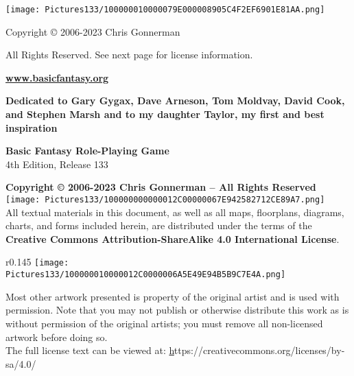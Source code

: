 \documentclass[a4paper,twoside,openany,10pt]{book}
\begin{document}
	
\justifying
\thispagestyle{empty}

\begin{center}
\texttt{[image: Pictures133/100000010000079E000008905C4F2EF6901E81AA.png]}
\end{center}

\begin{center}

{{\huge Copyright © 2006-2023 Chris Gonnerman}}\bigskip

{\LARGE All Rights Reserved. See next page for license information}.\bigskip

{\LARGE \href{https://www.basicfantasy.org}{\textbf{www.basicfantasy.org}}}\bigskip
 
\end{center}

\pagebreak

\thispagestyle{empty}

\begin{center}
\textbf{Dedicated to Gary Gygax, Dave Arneson, Tom Moldvay, David Cook, and Stephen Marsh and to my daughter Taylor, my first and best inspiration}
\end{center}

\addvspace{1.5cm}

{\large \textbf{Basic Fantasy Role-Playing Game}}\\

{\large 4th Edition, Release 133}

\textbf{Copyright © 2006-2023 Chris Gonnerman -- All Rights Reserved}
\hfill
\texttt{[image: Pictures133/100000000000012C00000067E942582712CE89A7.png]}\\

All textual materials in this document, as well as all maps, floorplans, diagrams, charts, and forms included herein, are distributed under the terms of the \textbf{Creative Commons Attribution-ShareAlike 4.0 International License}.
\begin{wrapfigure}{r}{0.145\textwidth}
	\texttt{[image: Pictures133/100000010000012C0000006A5E49E94B5B9C7E4A.png]}
\end{wrapfigure}

Most other artwork presented is property of the original artist and is used with permission. Note that you may not publish or otherwise distribute this work as is without permission of the original artists; you must remove all non-licensed artwork before doing so.\\

The full license text can be viewed at:  \href{https://creativecommons.org/licenses/by-sa/4.0/} https://creativecommons.org/licenses/by-sa/4.0/\\
\end{document}
